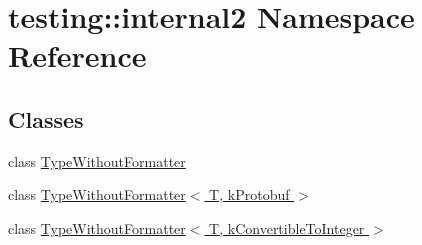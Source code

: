 \hypertarget{namespacetesting_1_1internal2}{\section{testing\-:\-:internal2 Namespace Reference}
\label{namespacetesting_1_1internal2}
}
\subsection*{Classes}
\begin{DoxyCompactItemize}
\item 
class \hyperlink{classtesting_1_1internal2_1_1_type_without_formatter}{Type\-Without\-Formatter}
\item 
class \hyperlink{classtesting_1_1internal2_1_1_type_without_formatter_3_01_t_00_01k_protobuf_01_4}{Type\-Without\-Formatter$<$ T, k\-Protobuf $>$}
\item 
class \hyperlink{classtesting_1_1internal2_1_1_type_without_formatter_3_01_t_00_01k_convertible_to_integer_01_4}{Type\-Without\-Formatter$<$ T, k\-Convertible\-To\-Integer $>$}
\end{DoxyCompactItemize}

